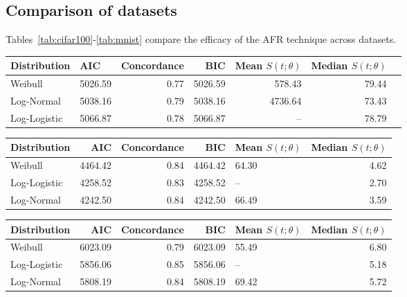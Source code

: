 \newpage
\subsection{Comparison of datasets}
Tables~\ref{tab:cifar100}-\ref{tab:mnist} compare the efficacy of the AFR technique across datasets.

\begin{table*}[h!]
\centering
\caption{Comparison of AFR Models on the CIFAR100 dataset.}
\label{tab:cifar100}
\begin{tabular}{llrrrrr}
\toprule
Distribution &     AIC &  Concordance &     BIC &  Mean  $S(t; \theta)$ &  Median $S(t; \theta)$ \\
\midrule
Weibull & 5026.59 &         0.77 & 5026.59 &              578.43 &                 79.44 \\
Log-Normal & 5038.16 &         0.79 & 5038.16 &             4736.64 &                 73.43 \\
Log-Logistic & 5066.87 &         0.78 & 5066.87 &                 -- &                 78.79 \\
\bottomrule
\end{tabular}
\end{table*}


\begin{table*}[h!]
\centering
\caption{Comparison of AFR Models on the CIFAR10 dataset.}
\label{tab:cifar}
\begin{tabular}{lrrrlr}
\toprule
Distribution & AIC & Concordance & BIC & Mean $S(t;\theta)$ & Median $S(t;\theta)$ \\
\midrule
Weibull & 4464.42 & 0.84 & 4464.42 & 64.30 & 4.62 \\
Log-Logistic & 4258.52 & 0.83 & 4258.52 & -- & 2.70 \\
Log-Normal & 4242.50 & 0.84 & 4242.50 & 66.49 & 3.59 \\
\bottomrule
\end{tabular}
\end{table*}


\begin{table*}[h!]
\centering
\caption{Comparison of AFR Models on the MNIST dataset.}
\label{tab:mnist}
\begin{tabular}{lrrrlr}
\toprule
Distribution & AIC & Concordance & BIC & Mean $S(t;\theta)$ & Median $S(t;\theta)$ \\
\midrule
Weibull & 6023.09 & 0.79 & 6023.09 & 55.49 & 6.80 \\
Log-Logistic & 5856.06 & 0.85 & 5856.06 & -- & 5.18 \\
Log-Normal & 5808.19 & 0.84 & 5808.19 & 69.42 & 5.72 \\
\bottomrule
\end{tabular}
\end{table*}
